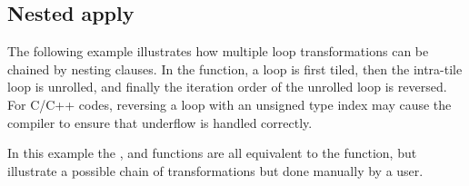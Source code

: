 


\subsection{Nested apply}

The following example illustrates how multiple loop transformations can be chained by nesting  clauses.
In the  function, a loop is first tiled, then the intra-tile
loop is unrolled, and finally the iteration order of the unrolled loop is reversed.
For C/C++ codes, reversing a loop with an unsigned type index may cause the compiler
to ensure that underflow is handled correctly.


In this example the ,  and 
functions are all equivalent to the  function, but illustrate
a possible chain of transformations but done manually by a user.


